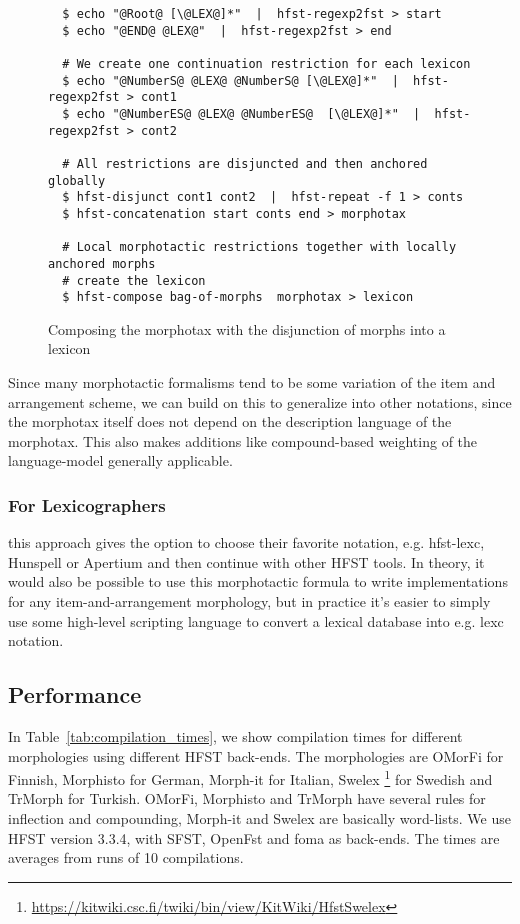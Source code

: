 \documentclass{llncs}
\begin{document}
\begin{figure} [h!]
\begin{verbatim}
  $ echo "@Root@ [\@LEX@]*"  |  hfst-regexp2fst > start
  $ echo "@END@ @LEX@"  |  hfst-regexp2fst > end

  # We create one continuation restriction for each lexicon
  $ echo "@NumberS@ @LEX@ @NumberS@ [\@LEX@]*"  |  hfst-regexp2fst > cont1
  $ echo "@NumberES@ @LEX@ @NumberES@  [\@LEX@]*"  |  hfst-regexp2fst > cont2

  # All restrictions are disjuncted and then anchored globally
  $ hfst-disjunct cont1 cont2  |  hfst-repeat -f 1 > conts
  $ hfst-concatenation start conts end > morphotax

  # Local morphotactic restrictions together with locally anchored morphs 
  # create the lexicon
  $ hfst-compose bag-of-morphs  morphotax > lexicon
\end{verbatim}
\caption{Composing the morphotax with the disjunction of morphs into a lexicon}
\label{fig:morphology2}
\end{figure}

Since many morphotactic formalisms tend to be some variation of the item and arrangement scheme,
we can build on this to generalize into other notations, since the morphotax itself
does not depend on the description language of the morphotax. 
This also makes additions like compound-based weighting of the language-model 
\cite{linden/2009/fsmnlp} generally applicable.

\subsubsection{For Lexicographers} this approach gives the option to
choose their favorite notation, e.g. hfst-lexc, Hunspell or Apertium and then continue with other
HFST tools. In theory, it would also be possible to use this morphotactic formula
to write implementations for any item-and-arrangement morphology, but in practice
it's easier to simply use some high-level scripting language to convert a lexical database into 
e.g. lexc notation.

\subsection{Performance}

In Table~\ref{tab:compilation_times}, we show compilation times for different 
morphologies using different HFST back-ends. The morphologies are OMorFi 
\cite{pirinen/2008} for Finnish, Morphisto \cite{zielinski/2009} for German,
Morph-it \cite{Zanchetta/2005} for Italian, Swelex 
\footnote{\url{https://kitwiki.csc.fi/twiki/bin/view/KitWiki/HfstSwelex}} 
for Swedish and TrMorph \cite{Coltekin/2010} for Turkish. 
OMorFi, Morphisto and TrMorph have several rules for
inflection and compounding, Morph-it and Swelex are basically word-lists.
We use HFST version 3.3.4, with SFST, OpenFst and foma as
back-ends. The times are averages from runs of 10 compilations.
\end{document}
